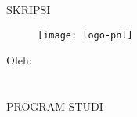 \begin{titlepage}
\begin{center}

\MakeUppercase{skripsi}

\vfill
\begin{figure}[h]
\centering
\texttt{[image: logo-pnl]}
\end{figure}

\vfill
\MakeUppercase{\judulId}

\vfill
Oleh: \\
\MakeUppercase{\mahasiswa} \\
\nim \\

\vfill
\MakeUppercase{
program studi \prodi \\
\jurusan \\
\institusi \\
\the\year{}
}

\end{center}
\end{titlepage}
